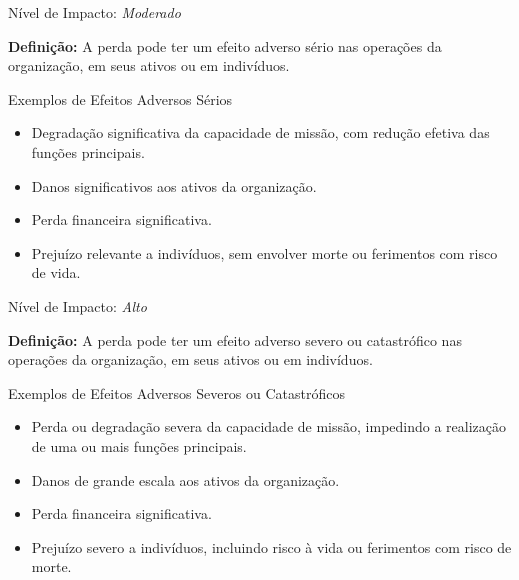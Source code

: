 \begin{frame}{Nível de Impacto: \textit{Moderado}}

\textbf{Definição:}  
A perda pode ter um efeito adverso sério nas operações da organização, em seus ativos ou em indivíduos.

\vspace{0.5em}
\begin{block}{Exemplos de Efeitos Adversos Sérios}
\begin{itemize}
    \item Degradação significativa da capacidade de missão, com redução efetiva das funções principais.
    \item Danos significativos aos ativos da organização.
    \item Perda financeira significativa.
    \item Prejuízo relevante a indivíduos, sem envolver morte ou ferimentos com risco de vida.
\end{itemize}
\end{block}

\end{frame}

\begin{frame}{Nível de Impacto: \textit{Alto}}

\textbf{Definição:}  
A perda pode ter um efeito adverso severo ou catastrófico nas operações da organização, em seus ativos ou em indivíduos.

\vspace{0.5em}
\begin{block}{Exemplos de Efeitos Adversos Severos ou Catastróficos}
\begin{itemize}
    \item Perda ou degradação severa da capacidade de missão, impedindo a realização de uma ou mais funções principais.
    \item Danos de grande escala aos ativos da organização.
    \item Perda financeira significativa.
    \item Prejuízo severo a indivíduos, incluindo risco à vida ou ferimentos com risco de morte.
\end{itemize}
\end{block}

\end{frame}


